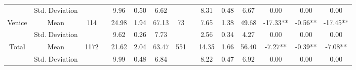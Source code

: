 \begin{sidewaystable}
{\begin{tabular}{cc|cccc|cccc|ccc}
~ & Std.  Deviation &  & 9.96 & 0.50 & 6.62 &  & 8.31 & 0.48 & 6.67 & 0.00 & 0.00 & 0.00 \\
Venice & Mean & \multirow{2}{*}{114 ~} & 24.98 & 1.94 & 67.13 & \multirow{2}{*}{73 ~} & 7.65 & 1.38 & 49.68 & -17.33** & -0.56** & -17.45** \\
~ & Std.  Deviation &  & 9.62 & 0.26 & 7.73 &  & 2.56 & 0.34 & 4.27 & 0.00 & 0.00 & 0.00 \\ 
\hline
Total & Mean & \multirow{2}{*}{1172 ~} & 21.62 & 2.04 & 63.47 & \multirow{2}{*}{551 ~} & 14.35 & 1.66 & 56.40 & -7.27** & -0.39** & -7.08** \\
 & Std. Deviation &  & 9.99 & 0.48 & 6.84 &  & 8.22 & 0.47 & 6.92 & 0.00 & 0.00 & 0.00 \\
\bottomrule
\end{tabular}
}
\end{sidewaystable}